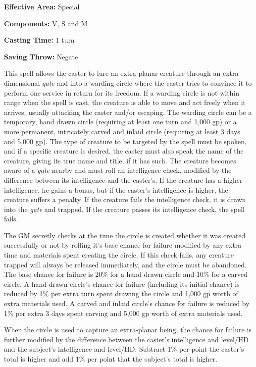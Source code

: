 \begin{multicols}{2}
\begin{minipage}{\columnwidth}
\noindent \textbf{Effective Area:} Special

\noindent \textbf{Components:} V, S and M

\noindent \textbf{Casting Time:} 1 turn

\noindent \textbf{Saving Throw:} Negate

\end{minipage}

This spell allows the caster to lure an extra-planar creature through an extra-dimensional \textit{gate} and into a warding circle where the caster tries to convince it to perform one service in return for its freedom.  If a warding circle is not within range when the spell is cast, the creature is able to move and act freely when it arrives, usually attacking the caster and/or escaping.  The warding circle can be a temporary, hand drawn circle (requiring at least one turn and 1,000 gp) or a more permanent, intricately carved and inlaid circle (requiring at least 3 days and 5,000 gp).  The type of creature to be targeted by the spell must be spoken, and if a specific creature is desired, the caster must also speak the name of the creature, giving its true name and title, if it has such.  The creature becomes aware of a \textit{gate} nearby and must roll an intelligence check, modified by the difference between its intelligence and the caster's.  If the creature has a higher intelligence, he gains a bonus, but if the caster's intelligence is higher, the creature suffers a penalty.  If the creature fails the intelligence check, it is drawn into the \textit{gate} and trapped.  If the creature passes its intelligence check, the spell fails.

The GM secretly checks at the time the circle is created whether it was created successfully or not by rolling it's base chance for failure modified by any extra time and materials spent creating the circle.  If this check fails, any creature trapped will always be released immediately, and the circle must be abandoned.  The base chance for failure is 20\% for a hand drawn circle and 10\% for a carved circle.  A hand drawn circle's chance for failure (including its initial chance) is reduced by 1\% per extra turn spent drawing the circle and 1,000 gp worth of extra materials used.  A carved and inlaid circle's chance for failure is reduced by 1\% per extra 3 days spent carving and 5,000 gp worth of extra materials used.  

When the circle is used to capture an extra-planar being, the chance for failure is further modified by the difference between the caster's intelligence and level/HD and the subject's intelligence and level/HD.  Subtract 1\% per point the caster's total is higher and add 1\% per point that the subject's total is higher.  


\end{multicols}
